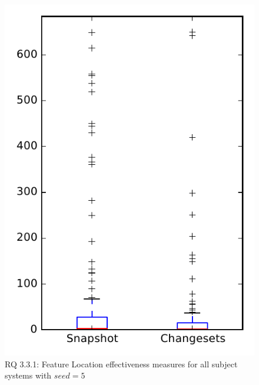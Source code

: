 
\begin{figure}
\centering
\includegraphics[height=0.4\textheight]{figures/flt_seed/rq1_overview_5}
\caption{RQ 3.3.1: Feature Location effectiveness measures for all subject systems with $seed=5$}
\label{fig:flt_seed:rq1:overview}
\end{figure}
